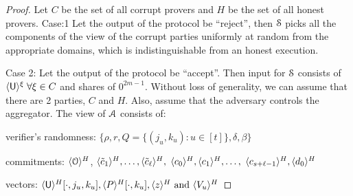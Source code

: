 \begin{proof}
	Let $C$ be the set of all corrupt provers and $H$ be the set of all honest provers. 
	Case:1 Let the output of the protocol be ``reject'', then $\mathcal{S}$ picks all the components of the view of the corrupt parties uniformly at random from the appropriate domains, which is indistinguishable from an honest execution.
	
	Case 2: Let the output of the protocol be ``accept''. Then input for $\mathcal{S}$ consists of $\langle{\mathsf{U}}\rangle^\xi \; \forall \xi\in C$ and shares of $0^{2m-1}$. Without loss of generality, we can assume that there are 2 parties, $C$ and $H$. Also, assume that the adversary controls the aggregator. The view of $\mathcal{A}$ consists of:
	
	verifier's randomness: $\{\rho, r, Q=\{(j_u,k_u):u\in[t]\}, \delta, \beta\}$
	
	commitments: $\langle{\mathcal{O}}\rangle^H$, $\langle{\tilde{c}_1}\rangle^H,\ldots,\langle{\tilde{c}_{\ell}}\rangle^H,$ $\langle{c_0}\rangle^H, \langle{c_1}\rangle^H, \ldots,$ $\langle{c_{s+\ell-1}}\rangle^H, \langle{d_0}\rangle^H$
	
	vectors: $\langle{\mathsf{U}}\rangle^H[\cdot,j_u,k_u], \langle{P}\rangle^H[\cdot,k_u], \langle{z}\rangle^H \text{ and } \langle{V_u}\rangle^H$
	

\end{proof}
